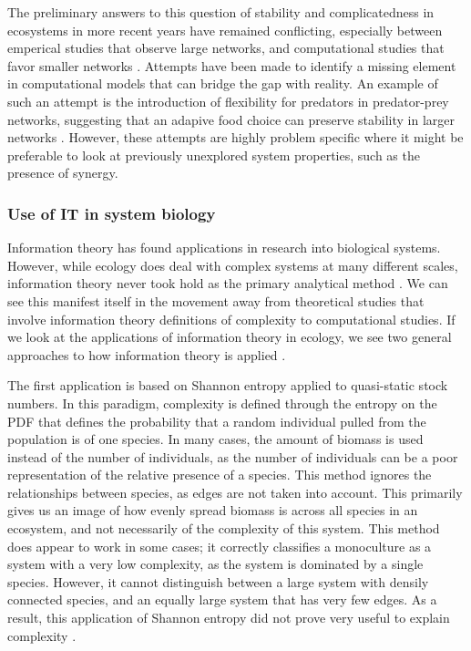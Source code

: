 \documentclass[../main.tex]{subfiles}
\begin{document}
The preliminary answers to this question of stability and complicatedness in ecosystems in more recent years have remained conflicting, especially between emperical studies that observe large networks, and computational studies that favor smaller networks \cite{pimm1984complexity}.
Attempts have been made to identify a missing element in computational models that can bridge the gap with reality.
An example of such an attempt is the introduction of flexibility for predators in predator-prey networks, suggesting that an adapive food choice can preserve stability in larger networks \cite{kondoh2003foraging}.
However, these attempts are highly problem specific where it might be preferable to look at previously unexplored system properties, such as the presence of synergy. %

\subsubsection{Use of IT in system biology}

Information theory has found applications in research into biological systems.
However, while ecology does deal with complex systems at many different scales, information theory never took hold as the primary analytical method \cite{ulanowicz2001information}. %
We can see this manifest itself in the movement away from theoretical studies that involve information theory definitions of complexity to computational studies.
If we look at the applications of information theory in ecology, we see two general approaches to how information theory is applied \cite{ulanowicz2001information}.

The first application is based on Shannon entropy applied to quasi-static stock numbers.
In this paradigm, complexity is defined through the entropy on the PDF that defines the probability that a random individual pulled from the population is of one species.
In many cases, the amount of biomass is used instead of the number of individuals, as the number of individuals can be a poor representation of the relative presence of a species.
This method ignores the relationships between species, as edges are not taken into account.
This primarily gives us an image of how evenly spread biomass is across all species in an ecosystem, and not necessarily of the complexity of this system.
This method does appear to work in some cases; it correctly classifies a monoculture as a system with a very low complexity, as the system is dominated by a single species.
However, it cannot distinguish between a large system with densily connected species, and an equally large system that has very few edges.
As a result, this application of Shannon entropy did not prove very useful to explain complexity \cite{ulanowicz2001information}.
\end{document}
